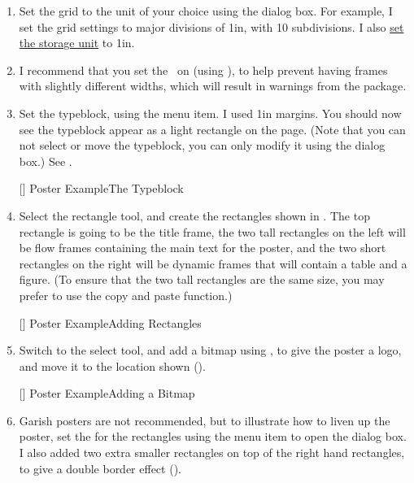 \begin{enumerate}
\item Set the grid to the unit of your choice using the
 dialog box. For example,
I set the grid settings to major divisions of 1in, with
10 subdivisions. I also
\hyperref[sec:controlsettings]{set the storage unit} to 1in.

\item I recommend that you set the \gridlock\ on (using
), to help prevent
having frames with slightly different widths, which will result
in warnings from the  package.

\item Set the \gls{typeblock}, using the
 menu item.
I used 1in margins. You should now see the typeblock appear
as a light  rectangle on the page. (Note that you can not
select or move the \gls{typeblock}, you can only modify it using the
 dialog box.)
See .

[]
{}
{Poster Example\dash The Typeblock}

\item Select the rectangle tool, and create the rectangles
shown in . The top rectangle is going to
be the title frame, the two tall rectangles on the left
will be flow frames containing the main text for the poster,
and the two short rectangles on the right will be dynamic frames
that will contain a table and a figure. (To ensure that the two tall
rectangles are the same size, you may prefer to use the copy and
paste function.)

[]
{}
{Poster Example\dash Adding Rectangles}

\item Switch to the select tool, and add a
\gls{bitmap} using
, to give the
poster a logo, and move it to the location shown
().

[]
{}
{Poster Example\dash Adding a Bitmap}

\item Garish posters are not recommended, but to illustrate how to
liven up the poster, set the  for the rectangles
using the  menu item to open
the  dialog box. I also added two
extra smaller rectangles on top of the right hand rectangles, to
give a double border effect ().


\end{enumerate}
